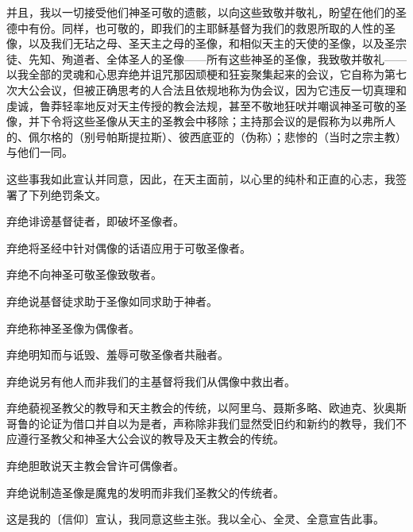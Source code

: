 并且，我以一切接受他们神圣可敬的遗骸，以向这些致敬并敬礼，盼望在他们的圣德中有份。同样，也可敬的，即我们的主耶稣基督为我们的救恩所取的人性的圣像，以及我们无玷之母、圣天主之母的圣像，和相似天主的天使的圣像，以及圣宗徒、先知、殉道者、全体圣人的圣像——所有这些神圣的圣像，我致敬并敬礼——以我全部的灵魂和心思弃绝并诅咒那因顽梗和狂妄聚集起来的会议，它自称为第七次大公会议，但被正确思考的人合法且依规地称为伪会议，因为它违反一切真理和虔诚，鲁莽轻率地反对天主传授的教会法规，甚至不敬地狂吠并嘲讽神圣可敬的圣像，并下令将这些圣像从天主的圣教会中移除；主持那会议的是假称为以弗所人的、佩尔格的（别号帕斯提拉斯）、彼西底亚的（伪称）；悲惨的（当时之宗主教）与他们一同。\par

这些事我如此宣认并同意，因此，在天主面前，以心里的纯朴和正直的心志，我签署了下列绝罚条文。\par

弃绝诽谤基督徒者，即破坏圣像者。\par

弃绝将圣经中针对偶像的话语应用于可敬圣像者。\par

弃绝不向神圣可敬圣像致敬者。\par

弃绝说基督徒求助于圣像如同求助于神者。\par

弃绝称神圣圣像为偶像者。\par

弃绝明知而与诋毁、羞辱可敬圣像者共融者。\par

弃绝说另有他人而非我们的主基督将我们从偶像中救出者。\par

弃绝藐视圣教父的教导和天主教会的传统，以阿里乌、聂斯多略、欧迪克、狄奥斯哥鲁的论证为借口并自以为是者，声称除非我们显然受旧约和新约的教导，我们不应遵行圣教父和神圣大公会议的教导及天主教会的传统。\par

弃绝胆敢说天主教会曾许可偶像者。\par

弃绝说制造圣像是魔鬼的发明而非我们圣教父的传统者。\par

这是我的〔信仰〕宣认，我同意这些主张。我以全心、全灵、全意宣告此事。\par

